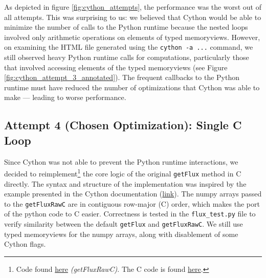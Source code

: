 \documentclass[a4paper,10pt]{article}
\begin{document}
As depicted in figure \ref{fig:cython_attempts}, the performance was the worst out of all attempts.
This was surprising to us: we believed that Cython would be able to minimize the number of calls to the Python runtime because the nested loops involved only arithmetic operations on elements of typed memoryviews.
However, on examining the HTML file generated using the \verb|cython -a ...| command, we still observed heavy Python runtime calls for computations, particularly those that involved accessing elements of the typed memoryviews (see Figure \ref{fig:cython_attempt_3_annotated}).
The frequent callbacks to the Python runtime must have reduced the number of optimizations that Cython was able to make --- leading to worse performance.

\subsection{Attempt 4 (Chosen Optimization): Single \textbf{C} Loop}
Since Cython was not able to prevent the Python runtime interactions, we decided to reimplement\footnote{Code found \href{https://github.com/paulmyr/DD2358-HPC25/blob/master/10_project_rishi_paul/code/cython/finitevolume_cython_lib.pyx\#L359}{here} \emph{(getFluxRawC)}. The C code is found \href{https://github.com/paulmyr/DD2358-HPC25/blob/master/10_project_rishi_paul/code/cython/flux.c}{here}.} the core logic of the original \verb|getFlux| method in C directly.
The syntax and structure of the implementation was inspired by the example presented in the Cython documentation (\href{https://docs.cython.org/en/latest/src/userguide/memoryviews.html\#pass-data-from-a-c-function-via-pointer}{link}).
The numpy arrays passed to the \verb|getFluxRawC| are in contiguous row-major (C) order, which makes the port of the python code to C easier.
Correctness is tested in the \verb|flux_test.py| file to verify similarity between the default \verb|getFlux| and \verb|getFluxRawC|.
We still use typed memoryviews for the numpy arrays, along with disablement of some Cython flags. 
\end{document}
